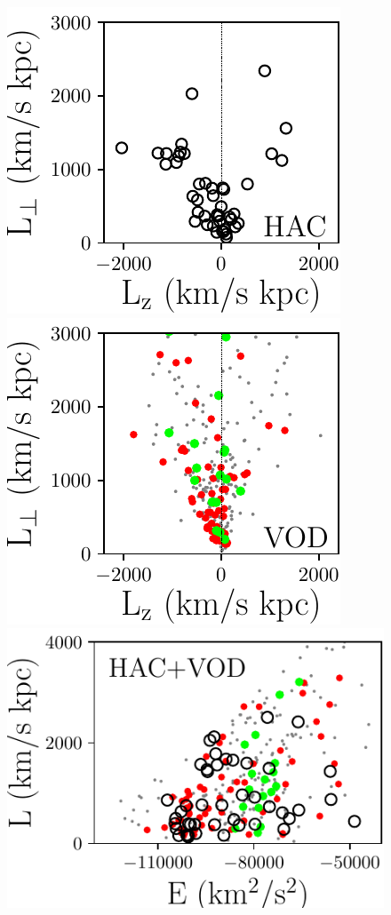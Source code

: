\documentclass[fleqn,usenatbib]{mnras}
\begin{document}
   \begin{figure}
	        \includegraphics[scale=0.40352]{HAC_Lz_Lp.pdf}
	    \includegraphics[scale=0.40352]{VOD_Lz_Lp.pdf}
        \includegraphics[scale=0.40352]{E_L.pdf}

\end{figure}
\end{document}
